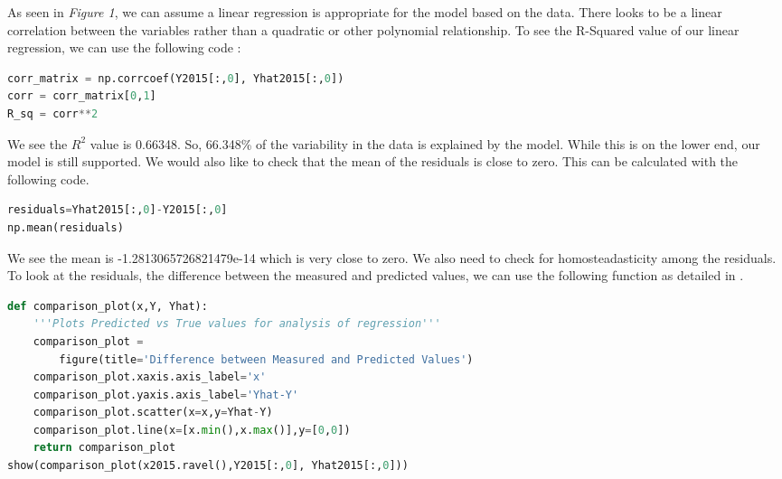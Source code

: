 \documentclass[12pt]{article}
\begin{document}
As seen in \textit{Figure 1}, we can assume a linear regression is appropriate for the model based on the data. There looks to be a linear correlation between the variables rather than a quadratic or other polynomial relationship. To see the R-Squared value of our linear regression, we can use the following code \citep{pythonr2}:
\begin{adjustwidth}{0.5in}{0.25in}
\begin{lstlisting}[language=Python]
corr_matrix = np.corrcoef(Y2015[:,0], Yhat2015[:,0])
corr = corr_matrix[0,1]
R_sq = corr**2
\end{lstlisting}
\end{adjustwidth}
We see the $R^2$ value is 0.66348. So, 66.348\% of the variability in the data is explained by the model. While this is on the lower end, our model is still supported. We would also like to check that the mean of the residuals is close to zero. This can be calculated with the following code.
\begin{adjustwidth}{0.5in}{0.25in}
\begin{lstlisting}[language=Python]
residuals=Yhat2015[:,0]-Y2015[:,0]
np.mean(residuals)
\end{lstlisting}
\end{adjustwidth}
We see the mean is -1.2813065726821479e-14 which is very close to zero. We also need to check for homosteadasticity among the residuals. To look at the residuals, the difference between the measured and predicted values, we can use the following function as detailed in \citet{teitelbaum2021linreg}.
\begin{adjustwidth}{0.5in}{0.25in}
\begin{lstlisting}[language=Python]
def comparison_plot(x,Y, Yhat):
    '''Plots Predicted vs True values for analysis of regression'''
    comparison_plot = 
        figure(title='Difference between Measured and Predicted Values')
    comparison_plot.xaxis.axis_label='x'
    comparison_plot.yaxis.axis_label='Yhat-Y'
    comparison_plot.scatter(x=x,y=Yhat-Y)
    comparison_plot.line(x=[x.min(),x.max()],y=[0,0])
    return comparison_plot
show(comparison_plot(x2015.ravel(),Y2015[:,0], Yhat2015[:,0]))
\end{lstlisting}
\end{adjustwidth}

\vspace{-40pt}
\end{document}

